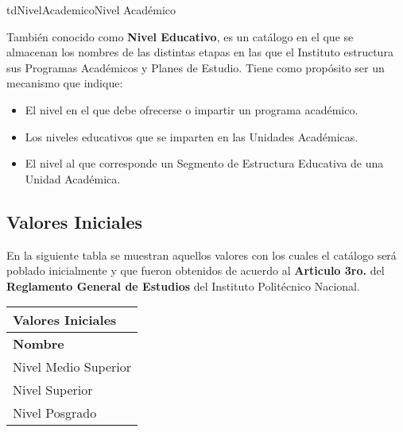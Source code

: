 \begin{TipoDeDato}{tdNivelAcademico}{Nivel Académico}{También conocido como \textbf{Nivel Educativo}, es un catálogo en el que se almacenan los nombres de las distintas etapas en las que el Instituto estructura sus Programas Académicos y Planes de Estudio. Tiene como propósito ser un mecanismo que indique:
	\begin{itemize}
		\item El nivel en el que debe ofrecerse o impartir un programa académico.
		\item Los niveles educativos que se imparten en las Unidades Académicas.
		\item El nivel al que corresponde un Segmento de Estructura Educativa de una Unidad Académica.
	\end{itemize}}

	\begin{tdAtributos}
	\end{tdAtributos}

	\subsection{Valores Iniciales}
	En la siguiente tabla se muestran aquellos valores con los cuales el catálogo será poblado inicialmente y que fueron obtenidos de acuerdo al \textbf{Articulo 3ro.} del \textbf{Reglamento General de Estudios} del Instituto Politécnico Nacional.\cdtEmpty
		
		\begin{longtable}{| p{}| }
	 			\rowcolor{colorPrincipal}
	 			\bf \color{white} Valores Iniciales\\
	 			\hline
	 			\rowcolor{colorSecundario}
	 			\bf \color{white} Nombre  \\
	 			\hline
	 			Nivel Medio Superior\\
	 			\hline
	 			Nivel Superior\\
	 			\hline
	 			Nivel Posgrado\\
	 			\hline
	 		\end{longtable}

\end{TipoDeDato}


